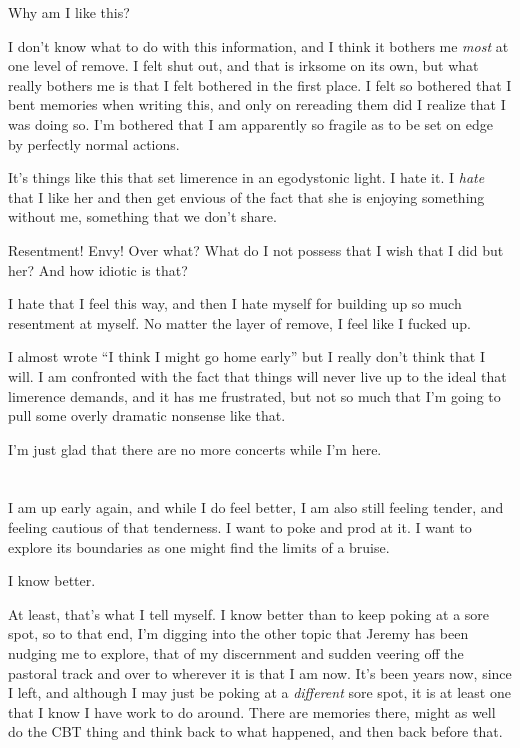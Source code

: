 Why am I like this?

I don't know what to do with this information, and I think it bothers me \emph{most} at one level of remove. I felt shut out, and that is irksome on its own, but what really bothers me is that I felt bothered in the first place. I felt so bothered that I bent memories when writing this, and only on rereading them did I realize that I was doing so. I'm bothered that I am apparently so fragile as to be set on edge by perfectly normal actions.

It's things like this that set limerence in an egodystonic light. I hate it. I \emph{hate} that I like her and then get envious of the fact that she is enjoying something without me, something that we don't share.

Resentment! Envy! Over what? What do I not possess that I wish that I did but her? And how idiotic is that?

I hate that I feel this way, and then I hate myself for building up so much resentment at myself. No matter the layer of remove, I feel like I fucked up.

I almost wrote ``I think I might go home early'' but I really don't think that I will. I am confronted with the fact that things will never live up to the ideal that limerence demands, and it has me frustrated, but not so much that I'm going to pull some overly dramatic nonsense like that.

I'm just glad that there are no more concerts while I'm here.

\section{}

I am up early again, and while I do feel better, I am also still feeling tender, and feeling cautious of that tenderness. I want to poke and prod at it. I want to explore its boundaries as one might find the limits of a bruise.

I know better.

At least, that's what I tell myself. I know better than to keep poking at a sore spot, so to that end, I'm digging into the other topic that Jeremy has been nudging me to explore, that of my discernment and sudden veering off the pastoral track and over to wherever it is that I am now. It's been years now, since I left, and although I may just be poking at a \emph{different} sore spot, it is at least one that I know I have work to do around. There are memories there, might as well do the CBT thing and think back to what happened, and then back before that.

